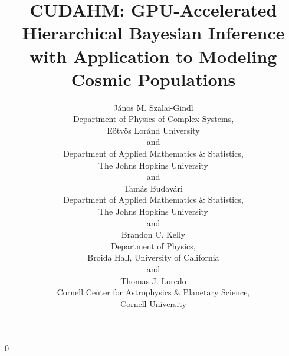 \documentclass[12pt]{article}
\newcommand{\blind}{0}
\numberwithin{equation}{section}
\numberwithin{figure}{section}
\numberwithin{table}{section}
\begin{document}
\def\spacingset#1{\renewcommand{\baselinestretch}%
{#1}\small\normalsize} \spacingset{1}

\blind
{
  \title{\bf CUDAHM:  GPU-Accelerated Hierarchical Bayesian Inference
  with Application to Modeling Cosmic Populations}
  \author{J\'anos M. Szalai-Gindl\\
    Department of Physics of Complex Systems,\\
    E\"otv\"os Lor\'and University\\
	and\\	
	Department of Applied Mathematics \& Statistics,\\    
    The Johns Hopkins University\\
    and \\
    Tam\'as Budav\'ari \\
    Department of Applied Mathematics \& Statistics,\\
    The Johns Hopkins University\\
    and \\
    Brandon C. Kelly \\
    Department of Physics,\\
    Broida Hall, University of California\\
    and \\
    Thomas J. Loredo \\
    Cornell Center for Astrophysics \& Planetary Science,\\
    Cornell University \\%
}
    
  \maketitle
} \fi
\end{document}
